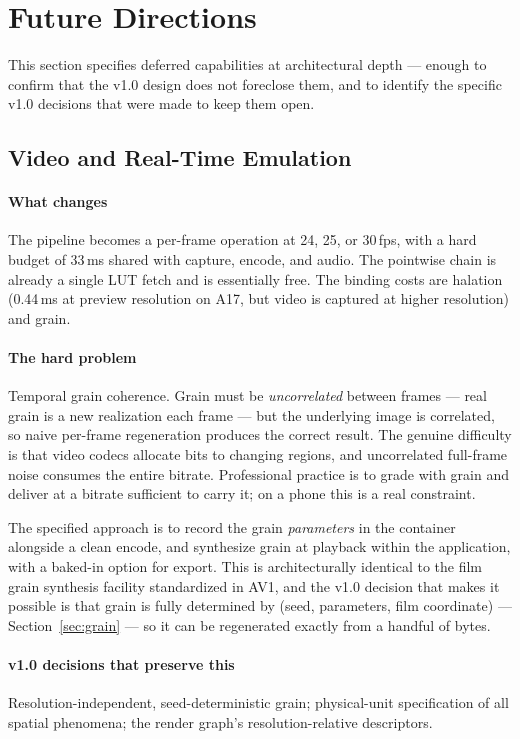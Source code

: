 \section{Future Directions}
\label{sec:future}

This section specifies deferred capabilities at architectural depth --- enough
to confirm that the v1.0 design does not foreclose them, and to identify the
specific v1.0 decisions that were made to keep them open.

\subsection{Video and Real-Time Emulation}

\paragraph{What changes} The pipeline becomes a per-frame operation at 24, 25,
or 30\,fps, with a hard budget of 33\,ms shared with capture, encode, and audio.
The pointwise chain is already a single LUT fetch and is essentially free. The
binding costs are halation (0.44\,ms at preview resolution on A17, but video is
captured at higher resolution) and grain.

\paragraph{The hard problem} Temporal grain coherence. Grain must be
\emph{uncorrelated} between frames --- real grain is a new realization each
frame --- but the underlying image is correlated, so naive per-frame
regeneration produces the correct result. The genuine difficulty is that video
codecs allocate bits to changing regions, and uncorrelated full-frame noise
consumes the entire bitrate. Professional practice is to grade with grain and
deliver at a bitrate sufficient to carry it; on a phone this is a real
constraint.

The specified approach is to record the grain \emph{parameters} in the container
alongside a clean encode, and synthesize grain at playback within the
application, with a baked-in option for export. This is architecturally
identical to the film grain synthesis facility standardized in AV1, and the v1.0
decision that makes it possible is that grain is fully determined by
(seed, parameters, film coordinate) --- Section~\ref{sec:grain} --- so it can be
regenerated exactly from a handful of bytes.

\paragraph{v1.0 decisions that preserve this} Resolution-independent,
seed-deterministic grain; physical-unit specification of all spatial phenomena;
the render graph's resolution-relative descriptors.

